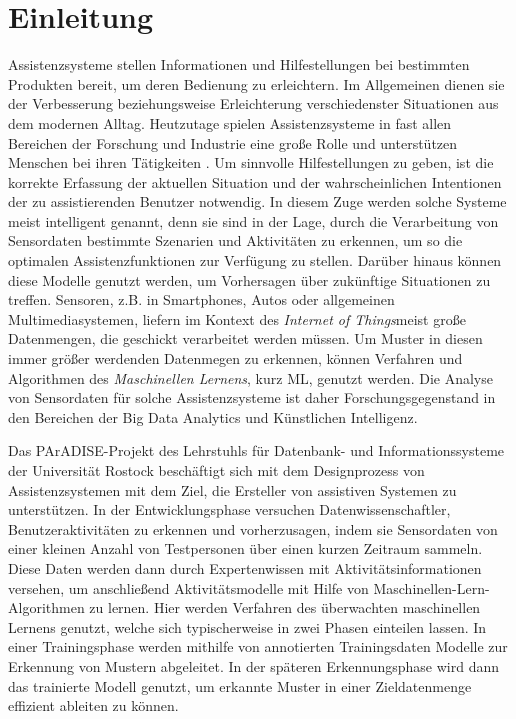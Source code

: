 \chapter{Einleitung}
\label{kap:intro}
Assistenzsysteme stellen Informationen und Hilfestellungen bei bestimmten Produkten bereit, um deren Bedienung zu erleichtern. Im Allgemeinen dienen sie der Verbesserung beziehungsweise Erleichterung verschiedenster Situationen aus dem modernen Alltag.
Heutzutage spielen Assistenzsysteme in fast allen Bereichen der Forschung und Industrie eine große Rolle und unterstützen Menschen bei ihren Tätigkeiten \cite{winner2014handbook, kurihata2005rainy, omerdic2011design}. Um sinnvolle Hilfestellungen zu geben, ist die korrekte Erfassung der aktuellen Situation und
der wahrscheinlichen Intentionen der zu assistierenden Benutzer notwendig. 
In diesem Zuge werden solche Systeme meist intelligent genannt, denn sie sind in der Lage, durch die Verarbeitung von Sensordaten bestimmte Szenarien und Aktivitäten zu erkennen, um so die optimalen Assistenzfunktionen zur Verfügung zu stellen. Darüber hinaus können diese Modelle genutzt werden, um Vorhersagen über zukünftige Situationen zu treffen.
Sensoren, z.B. in Smartphones, Autos oder allgemeinen Multimediasystemen, liefern im Kontext des \textit{Internet of Things}\cite{xia2012internet, wortmann2015internet}meist große Datenmengen, die geschickt verarbeitet werden müssen. Um Muster in diesen immer größer werdenden Datenmegen zu erkennen, können Verfahren und Algorithmen des \textit{Maschinellen Lernens}\cite{Goodfellow-et-al-2016}, kurz ML, genutzt werden. Die Analyse von Sensordaten für solche Assistenzsysteme ist daher Forschungsgegenstand in den Bereichen der Big Data Analytics\cite{d2019big} und Künstlichen Intelligenz. 

Das PArADISE-Projekt\cite{paradise} des Lehrstuhls für Datenbank- und Informationssysteme der Universität Rostock beschäftigt sich mit dem Designprozess von Assistenzsystemen mit dem Ziel, die Ersteller von assistiven Systemen zu unterstützen. In der Entwicklungsphase versuchen Datenwissenschaftler, Benutzeraktivitäten zu erkennen und vorherzusagen, indem sie Sensordaten von einer kleinen Anzahl von Testpersonen über einen kurzen Zeitraum sammeln. Diese Daten werden dann durch Expertenwissen mit Aktivitätsinformationen versehen, um anschließend Aktivitätsmodelle mit Hilfe von Maschinellen-Lern-Algorithmen zu lernen. Hier werden Verfahren des überwachten maschinellen Lernens genutzt, welche sich typischerweise in zwei Phasen einteilen lassen. In einer Trainingsphase werden mithilfe von annotierten Trainingsdaten Modelle zur Erkennung von Mustern abgeleitet. In der späteren Erkennungsphase wird dann das
trainierte Modell genutzt, um erkannte Muster in einer Zieldatenmenge effizient ableiten
zu können. 
